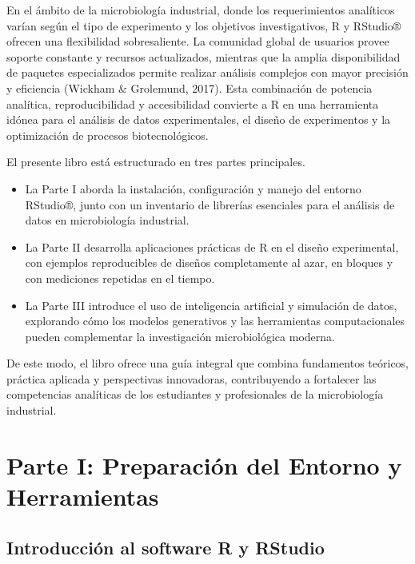 \documentclass[
  spanish,
  letterpaper,
  DIV=11,
  numbers=noendperiod]{scrreprt}
\begin{document}
En el ámbito de la microbiología industrial, donde los requerimientos
analíticos varían según el tipo de experimento y los objetivos
investigativos, R y RStudio® ofrecen una flexibilidad sobresaliente. La
comunidad global de usuarios provee soporte constante y recursos
actualizados, mientras que la amplia disponibilidad de paquetes
especializados permite realizar análisis complejos con mayor precisión y
eficiencia (Wickham \& Grolemund, 2017). Esta combinación de potencia
analítica, reproducibilidad y accesibilidad convierte a R en una
herramienta idónea para el análisis de datos experimentales, el diseño
de experimentos y la optimización de procesos biotecnológicos.

El presente libro está estructurado en tres partes principales.

\begin{itemize}
\item
  La Parte I aborda la instalación, configuración y manejo del entorno
  RStudio®, junto con un inventario de librerías esenciales para el
  análisis de datos en microbiología industrial.
\item
  La Parte II desarrolla aplicaciones prácticas de R en el diseño
  experimental, con ejemplos reproducibles de diseños completamente al
  azar, en bloques y con mediciones repetidas en el tiempo.
\item
  La Parte III introduce el uso de inteligencia artificial y simulación
  de datos, explorando cómo los modelos generativos y las herramientas
  computacionales pueden complementar la investigación microbiológica
  moderna.
\end{itemize}

De este modo, el libro ofrece una guía integral que combina fundamentos
teóricos, práctica aplicada y perspectivas innovadoras, contribuyendo a
fortalecer las competencias analíticas de los estudiantes y
profesionales de la microbiología industrial.


\chapter{Parte I: Preparación del Entorno y
Herramientas}\label{parte-i-preparaciuxf3n-del-entorno-y-herramientas}

\section{Introducción al software R y
RStudio}\label{introducciuxf3n-al-software-r-y-rstudio}
\end{document}

